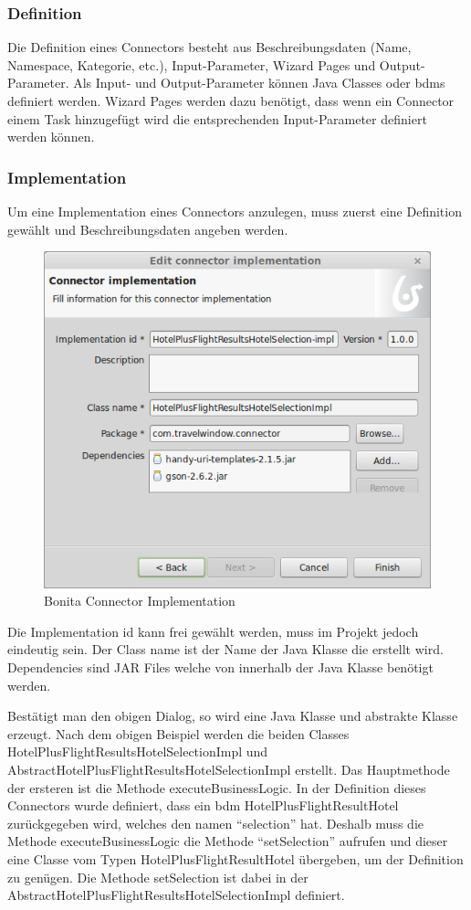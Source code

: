 \subsubsection{Definition}
Die Definition eines Connectors besteht aus Beschreibungsdaten (Name, Namespace, Kategorie, etc.), Input-Parameter, Wizard Pages und Output-Parameter. Als Input- und Output-Parameter können Java Classes oder \glspl{bdm} definiert werden. Wizard Pages werden dazu benötigt, dass wenn ein Connector einem Task hinzugefügt wird die entsprechenden Input-Parameter definiert werden können.

\subsubsection{Implementation}
Um eine Implementation eines Connectors anzulegen, muss zuerst eine Definition gewählt und Beschreibungsdaten angeben werden.
\begin{figure}[H]
	\centering
	\includegraphics[width=1\textwidth]{images/bonita-connectors-implementation.png}
	\caption{Bonita Connector Implementation}
	\label{fig:analyse:bonita:connectors:implementation}
\end{figure}
Die Implementation id kann frei gewählt werden, muss im Projekt jedoch eindeutig sein. Der Class name ist der Name der Java Klasse die erstellt wird. Dependencies sind JAR Files welche von innerhalb der Java Klasse benötigt werden.

Bestätigt man den obigen Dialog, so wird eine Java Klasse und abstrakte Klasse erzeugt. Nach dem obigen Beispiel werden die beiden Classes HotelPlusFlightResultsHotelSelectionImpl und AbstractHotelPlusFlightResultsHotelSelectionImpl erstellt. Das Hauptmethode der ersteren ist die Methode executeBusinessLogic. In der Definition dieses Connectors wurde definiert, dass ein \gls{bdm} HotelPlusFlightResultHotel zurückgegeben wird, welches den namen "`selection"' hat. Deshalb muss die Methode executeBusinessLogic die Methode "`setSelection"' aufrufen und dieser eine Classe vom Typen HotelPlusFlightResultHotel übergeben, um der Definition zu genügen. 
Die Methode setSelection ist dabei in der AbstractHotelPlusFlightResultsHotelSelectionImpl definiert.

